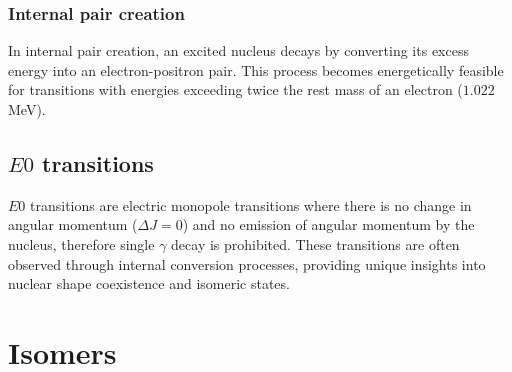 \subsubsection{Internal pair creation}\label{subsubsection:intro:internalpaircreation}
In internal pair creation, an excited nucleus decays by converting its excess energy into an electron-positron pair. This process becomes energetically feasible for transitions with energies exceeding twice the rest mass of an electron ($1.022$\,MeV).

\subsection{$E0$ transitions}\label{subsection:intro:e0trans}
$E0$ transitions are electric monopole transitions where there is no change in angular momentum ($\Delta J = 0$) and no emission of angular momentum by the nucleus, therefore single $\gamma$ decay is prohibited. These transitions are often observed through internal conversion processes, providing unique insights into nuclear shape coexistence and isomeric states.

\section{Isomers}\label{sec:intro:isomers}

